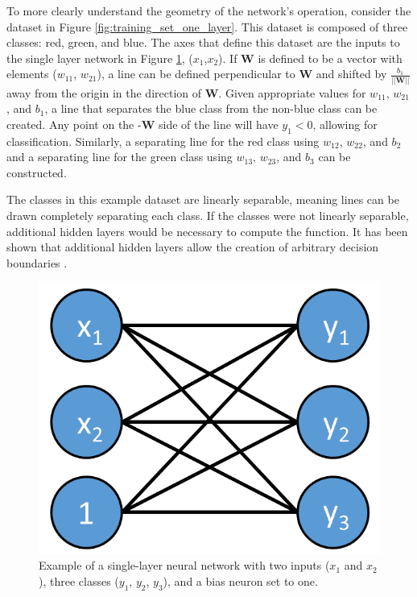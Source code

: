 To more clearly understand the geometry of the network's operation, consider the dataset in Figure \ref{fig:training_set_one_layer}. This dataset is composed of three classes: red, green, and blue. The axes that define this dataset are the inputs to the single layer network in Figure \ref{fig:one_layer_net}, ($x_1$,$x_2$). If $\mathbf{W}$ is defined to be a vector with elements ($w_{11}$, $w_{21}$), a line can be defined perpendicular to $\mathbf{W}$ and shifted by $\frac{b_1}{||\mathbf{W}||}$ away from the origin in the direction of $\mathbf{W}$. Given appropriate values for $w_{11}$, $w_{21}$, and $b_1$, a line that separates the blue class from the non-blue class can be created. Any point on the -$\mathbf{W}$ side of the line will have $y_1 < 0$, allowing for classification. Similarly, a separating line for the red class using $w_{12}$, $w_{22}$, and $b_2$ and a separating line for the green class using $w_{13}$, $w_{23}$, and $b_3$ can be constructed. 

The classes in this example dataset are linearly separable, meaning lines can be drawn completely separating each class. If the classes were not linearly separable, additional hidden layers would be necessary to compute the function. It has been shown that additional hidden layers allow the creation of arbitrary decision boundaries \cite{Hornik1991}. 
%
\begin{figure}[H]
	\centering
	\includegraphics[width=0.45\linewidth]{images/One_layer_net_v31}
	\caption{Example of a single-layer neural network with two inputs ($x_{1}$ and $x_{2}$), three classes ($y_{1}$, $y_{2}$, $y_{3}$), and a bias neuron set to one.}
	\label{fig:one_layer_net}
\end{figure}


